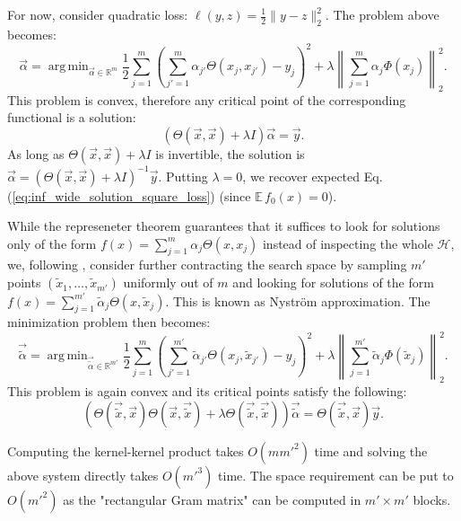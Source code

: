 \documentclass{article}
\newcommand{\HH}{\mathcal{H}}
\newcommand{\EE}{\mathbb{E}\,}
\newcommand{\RR}{\mathbb{R}}
\DeclareMathOperator*{\argmin}{arg\,min}
\begin{document}
    For now, consider quadratic loss: $\ell(y,z) = \frac{1}{2} \| y - z \|_2^2$.
    The problem above becomes:
    \begin{equation}
        \vec\alpha
        = \argmin_{\vec\alpha \in \RR^m} \frac{1}{2} \sum_{j=1}^m \left( \sum_{j'=1}^m \alpha_{j'} \Theta(x_j,x_{j'}) - y_j \right)^2 + \lambda \left\| \sum_{j=1}^m \alpha_j \Phi(x_j) \right\|_2^2.
    \end{equation}
    This problem is convex, therefore any critical point of the corresponding functional is a solution:
    \begin{equation}
        (\Theta(\vec x, \vec x) + \lambda I) \vec\alpha
        = \vec y.
    \end{equation}
    As long as $\Theta(\vec x, \vec x) + \lambda I$ is invertible, the solution is $\vec\alpha = (\Theta(\vec x, \vec x) + \lambda I)^{-1} \vec y$.
    Putting $\lambda = 0$, we recover expected Eq.(\ref{eq:inf_wide_solution_square_loss}) (since $\EE f_0(x) = 0$).

    While the represeneter theorem guarantees that it suffices to look for solutions only of the form $f(x) = \sum_{j=1}^m \alpha_j \Theta(x,x_j)$ instead of inspecting the whole $\HH$, we, following \cite{meanti2020kernel}, consider further contracting the search space by sampling $m'$ points $(\tilde x_1, \ldots, \tilde x_{m'})$ uniformly out of $m$ and looking for solutions of the form $f(x) = \sum_{j=1}^{m'} \tilde\alpha_j \Theta(x,\tilde x_j)$.
    This is known as Nystr\"om approximation.
    The minimization problem then becomes:
    \begin{equation}
        \vec{\tilde\alpha}
        = \argmin_{\vec{\tilde\alpha} \in \RR^{m'}} \frac{1}{2} \sum_{j=1}^m \left( \sum_{j'=1}^{m'} \tilde\alpha_{j'} \Theta(x_j,\tilde x_{j'}) - y_j \right)^2 + \lambda \left\| \sum_{j=1}^{m'} \tilde\alpha_j \Phi(\tilde x_j) \right\|_2^2.
    \end{equation}
    This problem is again convex and its critical points satisfy the following:
    \begin{equation}
        \left(\Theta\left(\vec{\tilde x}, \vec x\right) \Theta\left(\vec x, \vec{\tilde x}\right) + \lambda \Theta\left(\vec{\tilde x}, \vec{\tilde x}\right)\right) \vec{\tilde \alpha}
        = \Theta\left(\vec{\tilde x}, \vec x\right) \vec y.
        \label{eq:critical_points_nystrom}
    \end{equation}

    Computing the kernel-kernel product takes $O(m {m'}^2)$ time and solving the above system directly takes $O({m'}^3)$ time.
    The space requirement can be put to $O({m'}^2)$ as the "rectangular Gram matrix" can be computed in $m' \times m'$ blocks.
\end{document}
